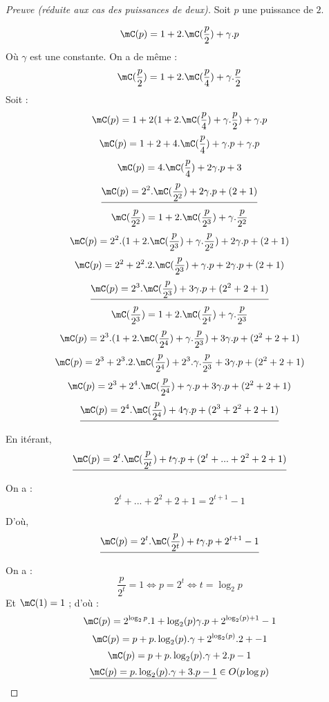 \begin{proof}[Preuve (réduite aux cas des puissances de deux)]
Soit $p$ une puissance de $2$.

$$
\mC(p) = 1 + 2. \mC(\frac{p}{2}) + \gamma.p
$$
Où $\gamma$ est une constante.
On a de même :
$$
\mC(\frac{p}{2}) = 1 + 2. \mC(\frac{p}{4}) + \gamma.\frac{p}{2}
$$
Soit : 
$$
\mC(p) = 1 + 2 (1 + 2. \mC(\frac{p}{4}) + \gamma.\frac{p}{2}) + \gamma.p
$$
$$
\mC(p) = 1 + 2 + 4. \mC(\frac{p}{4}) + \gamma.p + \gamma.p
$$
$$
\mC(p) = 4. \mC(\frac{p}{4}) + 2\gamma.p + 3
$$
$$
\underline{\mC(p) = 2^2 . \mC(\frac{p}{2^2}) + 2\gamma.p + (2+1)}
$$
%
$$
\mC(\frac{p}{2^2}) = 1 + 2. \mC(\frac{p}{2^3}) + \gamma.\frac{p}{2^2}
$$
%
$$
\mC(p) = 2^2 . (1 + 2. \mC(\frac{p}{2^3}) + \gamma.\frac{p}{2^2}) + 2\gamma.p + (2+1)
$$
$$
\mC(p) =  2^2 + 2^2.2. \mC(\frac{p}{2^3}) + \gamma.p + 2\gamma.p + (2+1)
$$
$$
\underline{\mC(p) = 2^3. \mC(\frac{p}{2^3}) + 3\gamma.p 
	+ (2^2+2+1)}
$$
$$
\mC(\frac{p}{2^3}) =
	1 + 2. \mC(\frac{p}{2^4}) + \gamma. \frac{p}{2^3}
$$
$$
\mC(p) = 2^3. (1 + 2. \mC(\frac{p}{2^4}) + \gamma. \frac{p}{2^3}) + 3\gamma.p 
	+ (2^2+2+1)
$$
$$
\mC(p) = 2^3 + 2^3.2. \mC(\frac{p}{2^4}) + 2^3.\gamma. \frac{p}{2^3} + 3\gamma.p 
	+ (2^2+2+1)
$$
$$
\mC(p) = 2^3 + 2^4. \mC(\frac{p}{2^4}) + \gamma.p + 3\gamma.p 
	+ (2^2+2+1)
$$
$$
\underline{
\mC(p) = 2^4. \mC(\frac{p}{2^4}) + 4\gamma.p 
	+ (2^3+2^2+2+1)}
$$

En itérant, 
$$
\underline{
\mC(p) = 2^t. \mC(\frac{p}{2^t}) + t\gamma.p 
	+ (2^t+...+2^2+2+1)}
$$

On a :
$$
2^t+...+2^2+2+1 = 2^{t+1} - 1
$$

D'où, 
$$
\underline{
\mC(p) = 2^t. \mC(\frac{p}{2^t}) + t\gamma.p 
	+ 2^{t+1}-1}
$$

On a :
$$
\frac{p}{2^t} = 1 \iff p = 2^t \iff t = \log_2 p
$$
Et $\mC(1) = 1$ ; d'où :
$$
\mC(p) = 2^{\log_2 p}. 1 + \log_2( p) \gamma.p 
	+ 2^{\log_2 (p)+1}-1
$$
$$
\mC(p) = p + p.\log_2( p).\gamma 
	+ 2^{\log_2 (p)}.2+-1
$$
$$
\mC(p) = p + p.\log_2( p).\gamma 
	+ 2.p -1
$$
$$
\underline{\mC(p) = 
p.\log_2( p).\gamma+ 3.p -1} \in O(p\log p)
$$

\end{proof}

